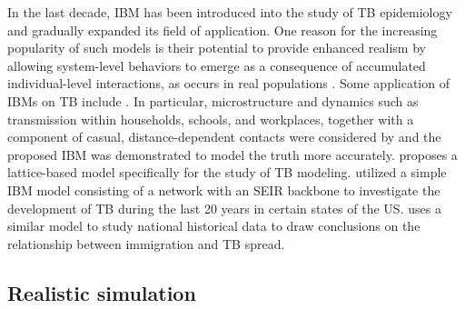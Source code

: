 \documentclass[8pt,twocolumn]{extarticle}
\begin{document}
In the last decade, IBM has been introduced into the study of TB epidemiology and gradually expanded its field of application. One reason for the increasing popularity of such models is their potential to provide enhanced realism by allowing system-level behaviors to emerge as a consequence of accumulated individual-level interactions, as occurs in real populations \cite{Review2018,TB2013}. Some application of IBMs on TB include \cite{Arkansas2011,Canada2017,Barcelona2016,TBinBarcelona2015}. In particular, microstructure and dynamics such as transmission within households, schools, and workplaces, together with a component of casual, distance-dependent contacts were considered by \cite{IBMTB2011} and the proposed IBM was demonstrated to model the truth more accurately. \cite{IBMTB2015} proposes a lattice-based model specifically for the study of TB modeling. \cite{IBMTB2017} utilized a simple IBM model consisting of a network with an SEIR backbone to investigate the development of TB during the last 20 years in certain states of the US. \cite{IBMTB2014} uses a similar model to study national historical data to draw conclusions on the relationship between immigration and TB spread.

\subsection{Realistic simulation}
\end{document}
